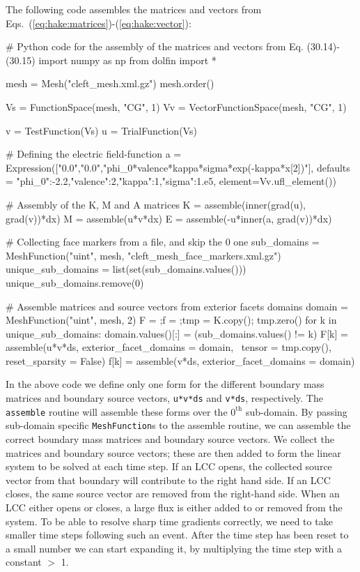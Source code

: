 The following \pydolfin code assembles the matrices and vectors from
Eqs.~(\ref{eq:hake:matrices})-(\ref{eq:hake:vector}):
\begin{python}
# Python code for the assembly of the matrices and vectors from Eq. (30.14)-(30.15)
import numpy as np
from dolfin import *

mesh = Mesh("cleft_mesh.xml.gz")
mesh.order()

Vs = FunctionSpace(mesh, "CG", 1)
Vv = VectorFunctionSpace(mesh, "CG", 1)

v = TestFunction(Vs)
u = TrialFunction(Vs)

# Defining the electric field-function
a = Expression(["0.0","0.0","phi_0*valence*kappa*sigma*exp(-kappa*x[2])"],
               defaults = {"phi_0":-2.2,"valence":2,"kappa":1,"sigma":1.e5},
               element=Vv.ufl_element())

# Assembly of the K, M and A matrices
K = assemble(inner(grad(u), grad(v))*dx)
M = assemble(u*v*dx)
E = assemble(-u*inner(a, grad(v))*dx)

# Collecting face markers from a file, and skip the 0 one
sub_domains = MeshFunction("uint", mesh, "cleft_mesh_face_markers.xml.gz")
unique_sub_domains = list(set(sub_domains.values()))
unique_sub_domains.remove(0)

# Assemble matrices and source vectors from exterior facets domains
domain = MeshFunction("uint", mesh, 2)
F = {};f = {};tmp = K.copy(); tmp.zero()
for k in unique_sub_domains:
    domain.values()[:] = (sub_domains.values() != k)
    F[k] = assemble(u*v*ds, exterior_facet_domains = domain, \
                    tensor = tmp.copy(), reset_sparsity = False)
    f[k] = assemble(v*ds, exterior_facet_domains = domain)
\end{python}
In the above code we define only one form for the different boundary
mass matrices and boundary source vectors, \texttt{u*v*ds} and
\texttt{v*ds}, respectively. The \texttt{assemble} routine will
assemble these forms over the $0^{\scriptscriptstyle\text{th}}$
sub-domain. By passing sub-domain specific \texttt{MeshFunction}s to
the assemble routine, we can assemble the correct boundary mass
matrices and boundary source vectors. We collect the matrices and
boundary source vectors; these are then added to form the linear
system to be solved at each time step. If an LCC opens, the collected
source vector from that boundary will contribute to the right hand
side. If an LCC closes, the same source vector are removed from the
right-hand side. When an LCC either opens or closes, a large flux is
either added to or removed from the system. To be able to resolve
sharp time gradients correctly, we need to take smaller time steps
following such an event. After the time step has been reset to a small
number we can start expanding it, by multiplying the time step with a
constant $>$ 1.

